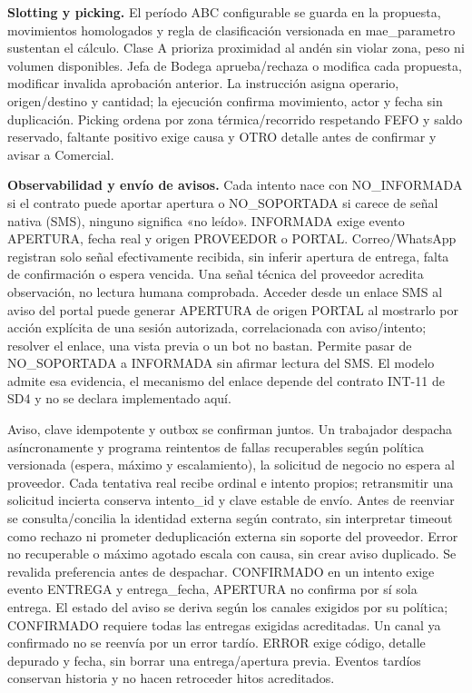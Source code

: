 \textbf{Slotting y picking.} El período ABC configurable se guarda en la propuesta, movimientos homologados y regla de clasificación versionada en mae\_parametro sustentan el cálculo. Clase A prioriza proximidad al andén sin violar zona, peso ni volumen disponibles. Jefa de Bodega aprueba/rechaza o modifica cada propuesta, modificar invalida aprobación anterior. La instrucción asigna operario, origen/destino y cantidad; la ejecución confirma movimiento, actor y fecha sin duplicación. Picking ordena por zona térmica/recorrido respetando FEFO y saldo reservado, faltante positivo exige causa y OTRO detalle antes de confirmar y avisar a Comercial.

\textbf{Observabilidad y envío de avisos.} Cada intento nace con NO\_INFORMADA si el contrato puede aportar apertura o NO\_SOPORTADA si carece de señal nativa (SMS), ninguno significa «no leído». INFORMADA exige evento APERTURA, fecha real y origen PROVEEDOR o PORTAL. Correo/WhatsApp registran solo señal efectivamente recibida, sin inferir apertura de entrega, falta de confirmación o espera vencida. Una señal técnica del proveedor acredita observación, no lectura humana comprobada. Acceder desde un enlace SMS al aviso del portal puede generar APERTURA de origen PORTAL al mostrarlo por acción explícita de una sesión autorizada, correlacionada con aviso/intento; resolver el enlace, una vista previa o un bot no bastan. Permite pasar de NO\_SOPORTADA a INFORMADA sin afirmar lectura del SMS. El modelo admite esa evidencia, el mecanismo del enlace depende del contrato INT-11 de SD4 y no se declara implementado aquí.

Aviso, clave idempotente y outbox se confirman juntos. Un trabajador despacha asíncronamente y programa reintentos de fallas recuperables según política versionada (espera, máximo y escalamiento), la solicitud de negocio no espera al proveedor. Cada tentativa real recibe ordinal e intento propios; retransmitir una solicitud incierta conserva intento\_id y clave estable de envío. Antes de reenviar se consulta/concilia la identidad externa según contrato, sin interpretar timeout como rechazo ni prometer deduplicación externa sin soporte del proveedor. Error no recuperable o máximo agotado escala con causa, sin crear aviso duplicado. Se revalida preferencia antes de despachar. CONFIRMADO en un intento exige evento ENTREGA y entrega\_fecha, APERTURA no confirma por sí sola entrega. El estado del aviso se deriva según los canales exigidos por su política; CONFIRMADO requiere todas las entregas exigidas acreditadas. Un canal ya confirmado no se reenvía por un error tardío. ERROR exige código, detalle depurado y fecha, sin borrar una entrega/apertura previa. Eventos tardíos conservan historia y no hacen retroceder hitos acreditados.

